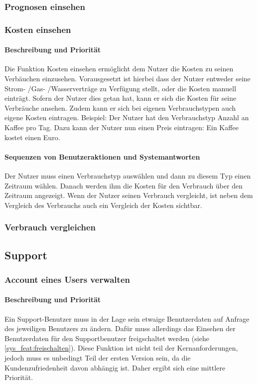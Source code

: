 \subsubsection{Prognosen einsehen}

\subsubsection{Kosten einsehen}
\paragraph{Beschreibung und Priorität}
Die Funktion Kosten einsehen ermöglicht dem Nutzer die Kosten zu seinen Verbäuchen einzusehen. Vorausgesetzt ist hierbei dass der Nutzer entweder seine Strom- /Gas- /Wasserverträge zu Verfügung stellt, oder die Kosten manuell einträgt. Sofern der Nutzer dies getan hat, kann er sich die Kosten für seine Verbräuche ansehen. Zudem kann er sich bei eigenen Verbrauchstypen auch eigene Kosten eintragen. Beispiel: Der Nutzer hat den Verbrauchstyp Anzahl an Kaffee pro Tag. Dazu kann der Nutzer nun einen Preis eintragen: Ein Kaffee kostet einen Euro. 
\paragraph{Sequenzen von Benutzeraktionen und Systemantworten}
Der Nutzer muss einen Verbrauchstyp auswählen und dann zu diesem Typ einen Zeitraum wählen. Danach werden ihm die Kosten für den Verbrauch über den Zeitraum angezeigt. Wenn der Nutzer seinen Verbrauch vergleicht, ist neben dem Vergleich des Verbrauchs auch ein Vergleich der Kosten sichtbar. 

\subsubsection{Verbrauch vergleichen}


\subsection{Support}
\subsubsection{Account eines Users verwalten}
\paragraph{Beschreibung und Priorität}
Ein Support-Benutzer muss in der Lage sein etwaige Benutzerdaten auf Anfrage des jeweiligen Benutzers zu ändern. Dafür muss allerdings das Einsehen der Benutzerdaten für den Supportbenutzer freigschaltet werden (siehe \ref{sys_feat:freischalten}). Diese Funktion ist nicht teil der Kernanforderungen, jedoch muss es unbedingt Teil der ersten Version sein, da die Kundenzufriedenheit davon abhängig ist. Daher ergibt sich eine mittlere Priorität.
